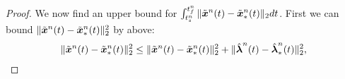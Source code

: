 \begin{proof}
\begin{comment}
\begin{cases} \genstateROMSolArgt{n-1}{\timeEndArg{n-1}} & n=2,\ldots,\nslabs, \\
\basisspace^T(\approxstateIC - \stateIntercept) & n=1, \end{cases}\\
&\adjointROMSolArgt{n}{\timeEndArg{n}} = \boldsymbol 0 .  \end{align*}
\begin{align*} 
&\frac{d}{dt} \genstateROMStarSolArg{n}   -
\basisspace^T  \velocity(\basisspace \genstateROMStarSolArg{n} + \stateIntercept,t) =  \adjointROMStarSolArg{n} , \\
 &\frac{d}{dt} \adjointROMStarSolArg{n} + \basisspace^T \bigg[\frac{\partial
\velocity}{\partial \stateyDiscrete}(\basisspace \genstateROMStarSolArg{n} +
\stateIntercept,t)\bigg]^T \basisspace \adjointROMStarSolArg{n} = \basisspace^T \bigg[
\frac{\partial \velocity}{\partial \stateyDiscrete} (\basisspace \genstateROMStarSolArg{n} +
\stateIntercept,t) \bigg]^T \bigg( \mathbf{I} -   \basisspace \basisspace^T
\bigg)    \velocity(\basisspace \genstateROMStarSolArg{n} + \stateIntercept,t) , \\  
& \genstateROMStarSolArgt{n}{\timeStartArg{n}} =
\begin{cases} \genstateROMStarSolArgt{n-1}{\timeEndArg{n-1}} & n=2,\ldots,\nslabs, \\
\basisspace^T(\approxstateIC - \stateIntercept) & n=1, \end{cases}\\
&\adjointROMStarSolArgt{n}{\timeEndArg{n}} = \boldsymbol 0 .  \end{align*}
\end{comment}
We now find an upper bound for $\int_{t_s^{n}}^{t_f^{n}} \| \tilde{\boldsymbol x}^{n}(t) - \tilde{\boldsymbol x}_{*}^{n}(t) \|_2 dt$. 
First we can bound $\| \tilde{\boldsymbol x}^{n}(t) - \tilde{\boldsymbol x}_{*}^{n}(t) \|_2^2$ by above:
\begin{align*}
\norm{\stateROMSolArgt{n}{t} - \stateROMStarSolArgt{n}{t}}^2 &\le  \norm{\stateROMSolArgt{n}{t} - \stateROMStarSolArgt{n}{t}}^2 + \norm{ \adjointROMSolArgt{n}{t} - 
\adjointROMStarSolArgt{n}{t} }^2 , \\

\end{align*}
\end{proof}
